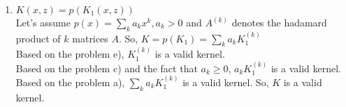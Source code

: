 \begin{answer}
\begin{enumerate}
\item $K(x,z) = p(K_1(x,z))$\\
Let's assume $p(x) = \sum\limits_k a_k x^k, a_k >0$ and $A^{(k)}$ denotes the hadamard product of $k$ matrices $A$. So, $K = p(K_1) = \sum\limits_k a_k K_1^{(k)}$\\
Based on the problem e), $K_1^{(k)}$ is a valid kernel.\\
Based on the problem c) and the fact that $a_k \geq 0$, $a_k K_1^{(k)}$ is a valid kernel.\\
Based on the problem a), $\sum\limits_k a_k K_1^{(k)}$ is a valid kernel. So, $K$ is a valid kernel.
\end{enumerate}
\end{answer}